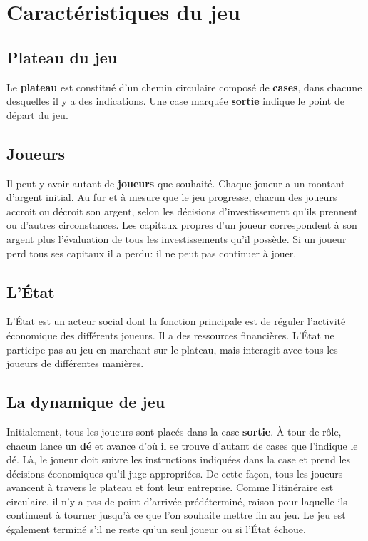 \documentclass[12pt]{article}
\begin{document}
\section{Caractéristiques du jeu}

    \subsection{Plateau du jeu}
    Le \textbf{plateau} est constitué d'un chemin circulaire composé de \textbf{cases},
dans chacune desquelles il y a des indications. Une case marquée \textbf{sortie}
indique le point de départ du jeu.

    \subsection{Joueurs}
    Il peut y avoir autant de \textbf{joueurs} que souhaité. Chaque joueur a un
montant d'argent initial. Au fur et à mesure que le jeu progresse, chacun des joueurs accroit
ou décroit son argent, selon les décisions d'investissement qu'ils prennent ou d'autres
circonstances. Les capitaux propres d'un joueur correspondent à
son argent plus l'évaluation de tous les investissements qu'il possède.
Si un joueur perd tous ses capitaux il a perdu: il ne peut pas continuer à jouer.
    
    \subsection{L'\'Etat}
    L'\'Etat est un acteur social dont la fonction principale est de réguler l'activité économique des
différents joueurs. Il a des ressources financières. L'État ne participe pas
au jeu en marchant sur le plateau, mais interagit avec tous les joueurs de différentes manières.

    \subsection{La dynamique de jeu}
    Initialement, tous les joueurs sont placés dans la case \textbf{sortie}. À tour de rôle, chacun lance
un \textbf{dé} et avance d'où il se trouve d'autant de cases que l'indique le
dé. Là, le joueur doit suivre les instructions
indiquées dans la case et prend les décisions économiques qu'il juge appropriées.
De cette façon, tous les joueurs avancent à travers le plateau et font leur
entreprise. Comme l'itinéraire est circulaire, il n'y a pas de point d'arrivée prédéterminé,
raison pour laquelle ils continuent à tourner jusqu'à ce que l'on souhaite mettre fin au jeu. 
Le jeu est également terminé s'il ne reste qu'un seul joueur ou si l'État échoue.
    
\end{document}
